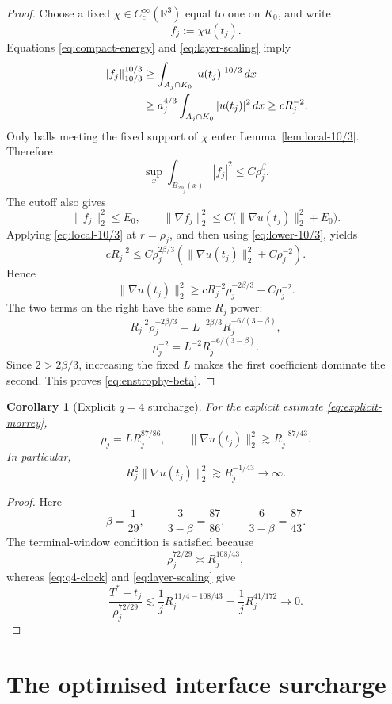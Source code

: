 \documentclass[11pt]{article}
\newtheorem{corollary}[theorem]{Corollary}
\theoremstyle{remark}
\newcommand{\R}{\mathbb R}
\begin{document}
\begin{proof}
Choose a fixed \(\chi\in C_c^\infty(\R^3)\) equal to one on \(K_0\), and
write
\[
 f_j:=\chi u(t_j).
\]
Equations \eqref{eq:compact-energy} and \eqref{eq:layer-scaling} imply
\begin{align}
 \|f_j\|_{10/3}^{10/3}
 &\ge
 \int_{A_j\cap K_0}|u(t_j)|^{10/3}\,dx \notag\\
 &\ge
 a_j^{4/3}
 \int_{A_j\cap K_0}|u(t_j)|^2\,dx
 \ge cR_j^{-2}.
 \label{eq:lower-10/3}
\end{align}
Only balls meeting the fixed support of \(\chi\) enter
Lemma~\ref{lem:local-10/3}.  Therefore
\[
 \sup_x\int_{B_{2\rho_j}(x)}|f_j|^2
 \le C\rho_j^\beta.
\]
The cutoff also gives
\[
 \|f_j\|_2^2\le E_0,
 \qquad
 \|\nabla f_j\|_2^2
 \le C\bigl(\|\nabla u(t_j)\|_2^2+E_0\bigr).
\]
Applying \eqref{eq:local-10/3} at \(r=\rho_j\), and then using
\eqref{eq:lower-10/3}, yields
\[
 cR_j^{-2}
 \le
 C\rho_j^{2\beta/3}
 \left(
 \|\nabla u(t_j)\|_2^2+C\rho_j^{-2}
 \right).
\]
Hence
\begin{equation}
 \label{eq:enstrophy-rearranged}
 \|\nabla u(t_j)\|_2^2
 \ge
 cR_j^{-2}\rho_j^{-2\beta/3}
 -C\rho_j^{-2}.
\end{equation}
The two terms on the right have the same \(R_j\) power:
\[
 R_j^{-2}\rho_j^{-2\beta/3}
 =L^{-2\beta/3}R_j^{-6/(3-\beta)},
\]
\[
 \rho_j^{-2}
 =L^{-2}R_j^{-6/(3-\beta)}.
\]
Since \(2>2\beta/3\), increasing the fixed \(L\) makes the first
coefficient dominate the second.  This proves
\eqref{eq:enstrophy-beta}.
\end{proof}

\begin{corollary}[Explicit \(q=4\) surcharge]
\label{cor:explicit}
For the explicit estimate \eqref{eq:explicit-morrey},
\[
 \rho_j=L R_j^{87/86},
 \qquad
 \|\nabla u(t_j)\|_2^2\gtrsim R_j^{-87/43}.
\]
In particular,
\[
 R_j^2\|\nabla u(t_j)\|_2^2
 \gtrsim R_j^{-1/43}\longrightarrow\infty.
\]
\end{corollary}

\begin{proof}
Here
\[
 \beta=\frac1{29},
 \qquad
 \frac3{3-\beta}=\frac{87}{86},
 \qquad
 \frac6{3-\beta}=\frac{87}{43}.
\]
The terminal-window condition is satisfied because
\[
 \rho_j^{72/29}\asymp R_j^{108/43},
\]
whereas \eqref{eq:q4-clock} and \eqref{eq:layer-scaling} give
\[
 \frac{T^*-t_j}{\rho_j^{72/29}}
 \lesssim
 \frac1jR_j^{\,11/4-108/43}
 =
 \frac1jR_j^{41/172}
 \longrightarrow0.
\]
\end{proof}

\section{The optimised interface surcharge}
\end{document}
